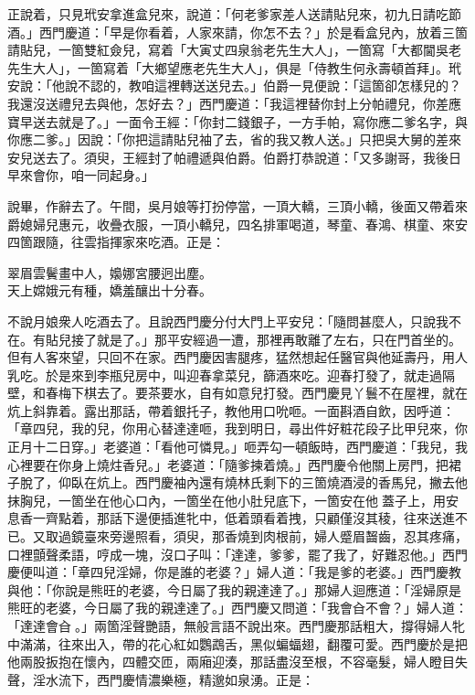 正說着，只見玳安拿進盒兒來，說道：「何老爹家差人送請貼兒來，初九日請吃節酒。」西門慶道：「早是你看着，人家來請，你怎不去？」於是看盒兒內，放着三箇請貼兒，一箇雙紅僉兒，寫着「大寅丈四泉翁老先生大人」，一箇寫「大都閫吳老先生大人」，一箇寫着「大鄉望應老先生大人」，俱是「侍教生何永壽頓首拜」。玳安說：「他說不認的，教咱這裡轉送送兒去。」伯爵一見便說：「這箇卻怎樣兒的？我還沒送禮兒去與他，怎好去？」西門慶道：「我這裡替你封上分帕禮兒，你差應寶早送去就是了。」一面令王經：「你封二錢銀子，一方手帕，寫你應二爹名字，與你應二爹。」因說：「你把這請貼兒袖了去，省的我又教人送。」只把吳大舅的差來安兒送去了。須臾，王經封了帕禮遞與伯爵。伯爵打恭說道：「又多謝哥，我後日早來會你，咱一同起身。」

說畢，作辭去了。午間，吳月娘等打扮停當，一頂大轎，三頂小轎，後面又帶着來爵媳婦兒惠元，收疊衣服，一頂小轎兒，四名排軍喝道，琴童、春鴻、棋童、來安四箇跟隨，往雲指揮家來吃酒。正是：

\begin{myquote}
翠眉雲鬢畫中人，嬝娜宮腰迥出塵。\\天上嫦娥元有種，嬌羞釀出十分春。
\end{myquote}

不說月娘衆人吃酒去了。且說西門慶分付大門上平安兒：「隨問甚麼人，只說我不在。有貼兒接了就是了。」那平安經過一遭，那裡再敢離了左右，只在門首坐的。但有人客來望，只回不在家。西門慶因害腿疼，猛然想起任醫官與他延壽丹，用人乳吃。{}於是來到李瓶兒房中，叫迎春拿菜兒，篩酒來吃。迎春打發了，就走過隔壁，和春梅下棋去了。要茶要水，自有如意兒打發。西門慶見丫鬟不在屋裡，就在炕上斜靠着。露出那話，帶着銀托子，教他用口吮咂。一面斟酒自飲，因呼道：「章四兒，我的兒，你用心替達達咂，我到明日，尋出件好粧花段子比甲兒來，你正月十二日穿。」老婆道：「看他可憐見。」咂弄勾一頓飯時，西門慶道：「我兒，我心裡要在你身上燒炷香兒。」老婆道：「隨爹揀着燒。」西門慶令他關上房門，把裙子脫了，仰臥在炕上。西門慶袖內還有燒林氏剩下的三箇燒酒浸的香馬兒，撇去他抹胸兒，一箇坐在他心口內，一箇坐在他小肚兒底下，一箇安在他𣭈蓋子上，用安息香一齊點着，那話下邊便插進牝中，低着頭看着拽，只顧僅沒其稜，往來送進不已。又取過鏡臺來旁邊照看，{}須臾，那香燒到肉根前，婦人蹙眉齧齒，忍其疼痛，口裡顫聲柔語，哼成一塊，沒口子叫：「達達，爹爹，罷了我了，好難忍他。」西門慶便叫道：「章四兒淫婦，你是誰的老婆？」婦人道：「我是爹的老婆。」西門慶教與他：「你說是熊旺的老婆，今日屬了我的親達達了。」{}那婦人迴應道：「淫婦原是熊旺的老婆，今日屬了我的親達達了。」西門慶又問道：「我會㒲不會？」婦人道：「達達會㒲𣭈。」兩箇淫聲艷語，無般言語不說出來。西門慶那話粗大，撐得婦人牝中滿滿，往來出入，帶的花心紅如鸚鵡舌，黑似蝙蝠翅，翻覆可愛。西門慶於是把他兩股扳抱在懷內，四體交匝，兩廂迎湊，那話盡沒至根，不容毫髮，婦人瞪目失聲，淫水流下，西門慶情濃樂極，精邈如泉湧。正是：

